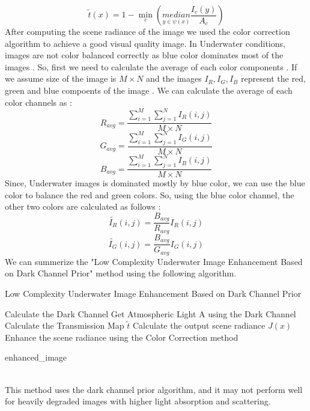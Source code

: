\documentclass[a4paper,11pt,oneside]{article}
\begin{document}
$$\tilde{t}(x) = 1 - \min_{c} (\underset{y\in\psi(x)}{median} \frac{I_{c}(y)}{A_{c}})$$
After computing the scene radiance of the image we used the color correction algorithm to achieve a good visual quality image. In Underwater conditions, images are not color balanced correctly as blue color dominates most of the images \cite{8}. So, first we need to calculate the average of each color components \cite{8}. If we assume size of the image is $M \times N$ and the images $I_R, I_G, I_B$ represent the red, green and blue compoents of the image \cite{8}. We can calculate the average of each color channels as \cite{8}:
$$R_{avg} = \frac{\sum_{i=1}^{M} \sum_{j=1}^{N}I_{R}(i,j)}{M \times N}$$
$$G_{avg} = \frac{\sum_{i=1}^{M} \sum_{j=1}^{N}I_{G}(i,j)}{M \times N}$$
$$B_{avg} = \frac{\sum_{i=1}^{M} \sum_{j=1}^{N}I_{B}(i,j)}{M \times N}$$
Since, Underwater images is dominated mostly by blue color, we can use the blue color to balance the red and green colors. So, using the blue color channel, the other two colors are calculated as follows \cite{8}:
$$\tilde{I_R}(i,j) = \frac{B_{avg}}{R_{avg}}I_R(i,j)$$
$$\tilde{I_G}(i,j) = \frac{B_{avg}}{G_{avg}}I_G(i,j)$$
We can summerize the "Low Complexity Underwater Image Enhancement Based on Dark Channel Prior" \cite{8} method using the following algorithm.
\begin{algorithm}
	\caption*{Low Complexity Underwater Image Enhancement Based on Dark Channel Prior \cite{8}}
	\begin{algorithmic}

    \State Calculate the Dark Channel
    \State Get Atmospheric Light A using the Dark Channel 
    \State Calculate the Transmission Map $\tilde{t}$
    \State Calculate the output scene radiance $J(x)$
    \State
    \State Enhance the scene radiance using the Color Correction method
    \State
    
    \Return enhanced\_image
\EndProcedure

\end{algorithmic}
\end{algorithm}\\
This method uses the dark channel prior algorithm, and it may not perform well for heavily degraded images with higher light absorption and scattering. 
\end{document}

